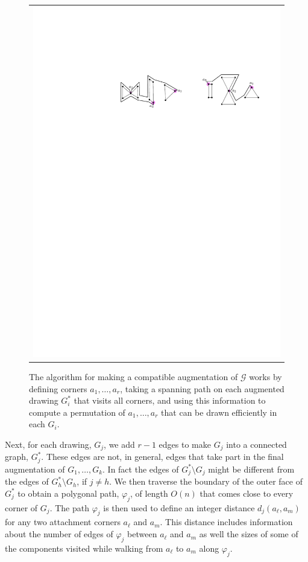 \documentclass[11pt]{patmorin}
\begin{document}
\begin{figure}
\begin{center}
\begin{tabular}{c}
     \includegraphics{img/example-4} 
   \end{tabular}
  \end{center}
  \caption{The algorithm for making a compatible augmentation of $\mathcal{G}$ works by defining corners $a_1,\ldots,a_r$, taking a spanning path on each augmented drawing $G_i^*$ that visits all corners, and using this information to compute a permutation of $a_1,\ldots,a_r$ that can be drawn efficiently in each $G_i$.}
  \label{figure:example}
\end{figure}

Next, for each drawing, $G_j$, we add $r-1$ edges to make $G_j$ into a
connected graph, $G_j^*$. These edges are not, in general, edges that
take part in the final augmentation of $G_1,\ldots,G_k$. In fact the
edges of $G_j^*\setminus G_j$ might be different from the edges of
$G_h^*\setminus G_h$, if $j\neq h$.  We then traverse the boundary
of the outer face of $G_j^*$ to obtain a polygonal path, $\varphi_j$,
of length $O(n)$ that comes close to every corner of $G_j$.  The path
$\varphi_j$ is then used to define an integer distance $d_j(a_\ell,a_m)$
for any two attachment corners $a_\ell$ and $a_m$. This distance includes
information about the number of edges of $\varphi_j$ between $a_\ell$
and $a_m$ as well the sizes of some of the components visited while
walking from $a_\ell$ to $a_m$ along $\varphi_j$.
\end{document}
